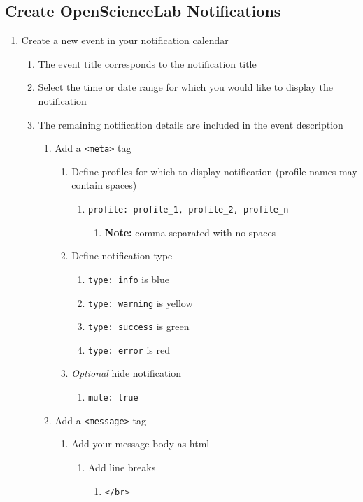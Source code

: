\subsection{Create OpenScienceLab Notifications}

\begin{enumerate}
\item Create a new event in your notification calendar\begin{enumerate}
\item The event title corresponds to the notification title
\item Select the time or date range for which you would like to display the notification
\item The remaining notification details are included in the event description\begin{enumerate}
\item Add a \texttt{\textless meta\textgreater } tag\begin{enumerate}
\item Define profiles for which to display notification (profile names may contain spaces)\begin{enumerate}
\item \texttt{profile: profile\_1, profile\_2, profile\_n}\begin{enumerate}
\item \textbf{Note:} comma separated with no spaces
\end{enumerate}
\end{enumerate}


\item Define notification type\begin{enumerate}
\item \texttt{type: info} is blue
\item \texttt{type: warning} is yellow
\item \texttt{type: success} is green
\item \texttt{type: error} is red
\end{enumerate}


\item \textit{Optional} hide notification\begin{enumerate}
\item \texttt{mute: true}
\end{enumerate}
\end{enumerate}


\item Add a \texttt{\textless message\textgreater } tag\begin{enumerate}
\item Add your message body as html\begin{enumerate}
\item Add line breaks\begin{enumerate}
\item \texttt{\textless /br\textgreater }
\end{enumerate}



\end{enumerate}
\end{enumerate}
\end{enumerate}
\end{enumerate}
\end{enumerate}
